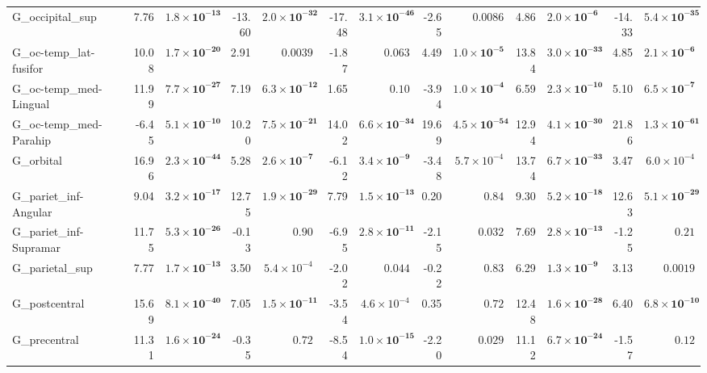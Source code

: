 {\begin{longtable}{llrrrrrrrrrrrr}
G\_occipital\_sup &  & 7.76 & $\mathbf{1.8{\times}10^{-13}}$ & -13.60 & $\mathbf{2.0{\times}10^{-32}}$ & -17.48 & $\mathbf{3.1{\times}10^{-46}}$ & -2.65 & $0.0086$ & 4.86 & $\mathbf{2.0{\times}10^{-6}}$ & -14.33 & $\mathbf{5.4{\times}10^{-35}}$ \\
G\_oc-temp\_lat-fusifor &  & 10.08 & $\mathbf{1.7{\times}10^{-20}}$ & 2.91 & $0.0039$ & -1.87 & $0.063$ & 4.49 & $\mathbf{1.0{\times}10^{-5}}$ & 13.84 & $\mathbf{3.0{\times}10^{-33}}$ & 4.85 & $\mathbf{2.1{\times}10^{-6}}$ \\
G\_oc-temp\_med-Lingual &  & 11.99 & $\mathbf{7.7{\times}10^{-27}}$ & 7.19 & $\mathbf{6.3{\times}10^{-12}}$ & 1.65 & $0.10$ & -3.94 & $\mathbf{1.0{\times}10^{-4}}$ & 6.59 & $\mathbf{2.3{\times}10^{-10}}$ & 5.10 & $\mathbf{6.5{\times}10^{-7}}$ \\
G\_oc-temp\_med-Parahip &  & -6.45 & $\mathbf{5.1{\times}10^{-10}}$ & 10.20 & $\mathbf{7.5{\times}10^{-21}}$ & 14.02 & $\mathbf{6.6{\times}10^{-34}}$ & 19.69 & $\mathbf{4.5{\times}10^{-54}}$ & 12.94 & $\mathbf{4.1{\times}10^{-30}}$ & 21.86 & $\mathbf{1.3{\times}10^{-61}}$ \\
G\_orbital &  & 16.96 & $\mathbf{2.3{\times}10^{-44}}$ & 5.28 & $\mathbf{2.6{\times}10^{-7}}$ & -6.12 & $\mathbf{3.4{\times}10^{-9}}$ & -3.48 & $5.7{\times}10^{-4}$ & 13.74 & $\mathbf{6.7{\times}10^{-33}}$ & 3.47 & $6.0{\times}10^{-4}$ \\
G\_pariet\_inf-Angular &  & 9.04 & $\mathbf{3.2{\times}10^{-17}}$ & 12.75 & $\mathbf{1.9{\times}10^{-29}}$ & 7.79 & $\mathbf{1.5{\times}10^{-13}}$ & 0.20 & $0.84$ & 9.30 & $\mathbf{5.2{\times}10^{-18}}$ & 12.63 & $\mathbf{5.1{\times}10^{-29}}$ \\
G\_pariet\_inf-Supramar &  & 11.75 & $\mathbf{5.3{\times}10^{-26}}$ & -0.13 & $0.90$ & -6.95 & $\mathbf{2.8{\times}10^{-11}}$ & -2.15 & $0.032$ & 7.69 & $\mathbf{2.8{\times}10^{-13}}$ & -1.25 & $0.21$ \\
G\_parietal\_sup &  & 7.77 & $\mathbf{1.7{\times}10^{-13}}$ & 3.50 & $5.4{\times}10^{-4}$ & -2.02 & $0.044$ & -0.22 & $0.83$ & 6.29 & $\mathbf{1.3{\times}10^{-9}}$ & 3.13 & $0.0019$ \\
G\_postcentral &  & 15.69 & $\mathbf{8.1{\times}10^{-40}}$ & 7.05 & $\mathbf{1.5{\times}10^{-11}}$ & -3.54 & $4.6{\times}10^{-4}$ & 0.35 & $0.72$ & 12.48 & $\mathbf{1.6{\times}10^{-28}}$ & 6.40 & $\mathbf{6.8{\times}10^{-10}}$ \\
G\_precentral &  & 11.31 & $\mathbf{1.6{\times}10^{-24}}$ & -0.35 & $0.72$ & -8.54 & $\mathbf{1.0{\times}10^{-15}}$ & -2.20 & $0.029$ & 11.12 & $\mathbf{6.7{\times}10^{-24}}$ & -1.57 & $0.12$ \\

\end{longtable}}
